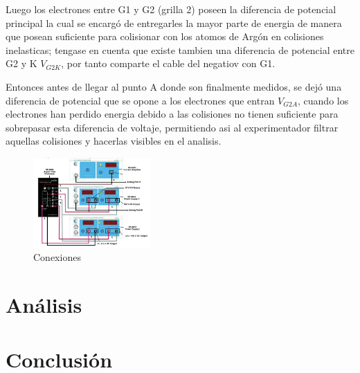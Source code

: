 \documentclass[a4paper,twocolumn,10pt]{article}
\begin{document}
Luego los electrones entre G1 y G2 (grilla 2) poseen la diferencia de potencial principal la cual se encargó de entregarles la mayor parte de energia de manera que posean suficiente para colisionar con los atomos de Argón en colisiones inelasticas; tengase en cuenta que existe tambien una diferencia de potencial entre G2 y K $V_{G2K}$, por tanto comparte el cable del negatiov con G1.

Entonces antes de llegar al punto A donde son finalmente medidos, se dejó una diferencia de potencial que se opone a los electrones que entran $V_{G2A}$, cuando los electrones han perdido energia debido a las colisiones no tienen suficiente para sobrepasar esta diferencia de voltaje, permitiendo asi al experimentador filtrar aquellas colisiones y hacerlas visibles en el analisis.

\begin{figure}[H]
    \centering
    \includegraphics[width=0.4\textwidth]{Imagenes/FranckHertz/circuit_connections.png}
    \caption{Conexiones}
    \label{fig:conexiones}
\end{figure}

\section{Análisis}



\section{Conclusión}

\medskip

\printbibliography
\end{document}
